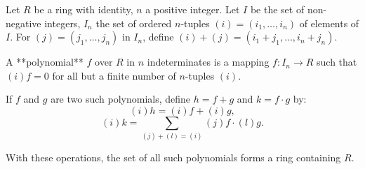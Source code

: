 Let $R$ be a ring with identity, $n$ a positive integer. Let $I$ be the set of non-negative integers, $I_n$ the set of ordered $n$-tuples $(i) = (i_1, \dots, i_n)$ of elements of $I$. For $(j) = (j_1, \dots, j_n)$ in $I_n$, define $(i) + (j) = (i_1 + j_1, \dots, i_n + j_n)$.

A **polynomial** $f$ over $R$ in $n$ indeterminates is a mapping $f: I_n \to R$ such that $(i)f = 0$ for all but a finite number of $n$-tuples $(i)$.

If $f$ and $g$ are two such polynomials, define $h = f + g$ and $k = f \cdot g$ by:
$$(i)h = (i)f + (i)g,$$
$$(i)k = \sum_{(j)+(l)=(i)} (j)f \cdot (l)g.$$

With these operations, the set of all such polynomials forms a ring containing $R$.
